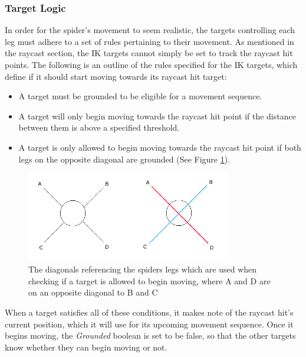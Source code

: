 \subsubsection{Target Logic}
In order for the spider's movement to seem realistic, the targets controlling
each leg must adhere to a set of rules pertaining to their movement. As
mentioned in the raycast section, the IK targets cannot simply be set to track
the raycast hit points. The following is an outline of the rules specified for
the IK targets, which define if it should start moving towards its raycast hit
target:
\begin{itemize}
    \item A target must be grounded to be eligible for a movement sequence.

    \item A target will only begin moving towards the raycast hit point if the
        distance between them is above a specified threshold.

    \item A target is only allowed to begin moving towards the raycast hit
        point if both legs on the opposite diagonal are grounded (See Figure
        \ref{fig:diagonals}).
\end{itemize}


\begin{figure}
    \centering
    \captionsetup{justification=centering}
    \includegraphics[width=0.8\textwidth]{grafika/diagonals.png}
    \caption{The diagonals referencing the spiders legs which are used when
    checking if a target is allowed to begin moving, where A and D are on an
opposite diagonal to B and C}
    \label{fig:diagonals}
\end{figure}

When a target satisfies all of these conditions, it makes note of the raycast
hit's current position, which it will use for its upcoming movement sequence.
Once it begins moving, the \textit{Grounded} boolean is set to be false, so that
the other targets know whether they can begin moving or not.

